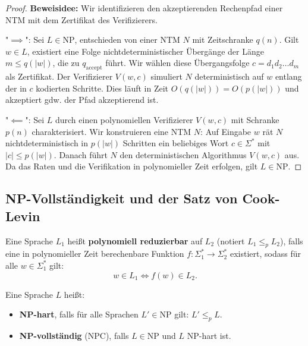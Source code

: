\begin{proof}
    \textbf{Beweisidee:} Wir identifizieren den akzeptierenden Rechenpfad einer NTM mit dem Zertifikat des Verifizierers.
    
    "$\implies$": Sei $L \in \mathrm{NP}$, entschieden von einer NTM $N$ mit Zeitschranke $q(n)$. Gilt $w \in L$, existiert eine Folge nichtdeterministischer Übergänge der Länge $m \le q(|w|)$, die zu $q_{\mathrm{accept}}$ führt. Wir wählen diese Übergangsfolge $c = d_1 d_2 \dots d_m$ als Zertifikat. Der Verifizierer $V(w, c)$ simuliert $N$ deterministisch auf $w$ entlang der in $c$ kodierten Schritte. Dies läuft in Zeit $O(q(|w|)) = O(p(|w|))$ und akzeptiert gdw. der Pfad akzeptierend ist.
    
    "$\impliedby$": Sei $L$ durch einen polynomiellen Verifizierer $V(w, c)$ mit Schranke $p(n)$ charakterisiert. Wir konstruieren eine NTM $N$: Auf Eingabe $w$ rät $N$ nichtdeterministisch in $p(|w|)$ Schritten ein beliebiges Wort $c \in \Sigma^*$ mit $|c| \le p(|w|)$. Danach führt $N$ den deterministischen Algorithmus $V(w, c)$ aus. Da das Raten und die Verifikation in polynomieller Zeit erfolgen, gilt $L \in \mathrm{NP}$.
\end{proof}

\subsection{NP-Vollständigkeit und der Satz von Cook-Levin}

\begin{definition}
    Eine Sprache $L_1$ heißt \textbf{polynomiell reduzierbar} auf $L_2$ (notiert $L_1 \le_p L_2$), falls eine in polynomieller Zeit berechenbare Funktion $f : \Sigma_1^* \to \Sigma_2^*$ existiert, sodass für alle $w \in \Sigma_1^*$ gilt:
    \[
        w \in L_1 \iff f(w) \in L_2.
    \]
\end{definition}

\begin{definition}
    Eine Sprache $L$ heißt:
    \begin{itemize}
        \item \textbf{NP-hart}, falls für alle Sprachen $L' \in \mathrm{NP}$ gilt: $L' \le_p L$.
        \item \textbf{NP-vollständig} ($\mathrm{NPC}$), falls $L \in \mathrm{NP}$ und $L$ NP-hart ist.
    \end{itemize}
\end{definition}

